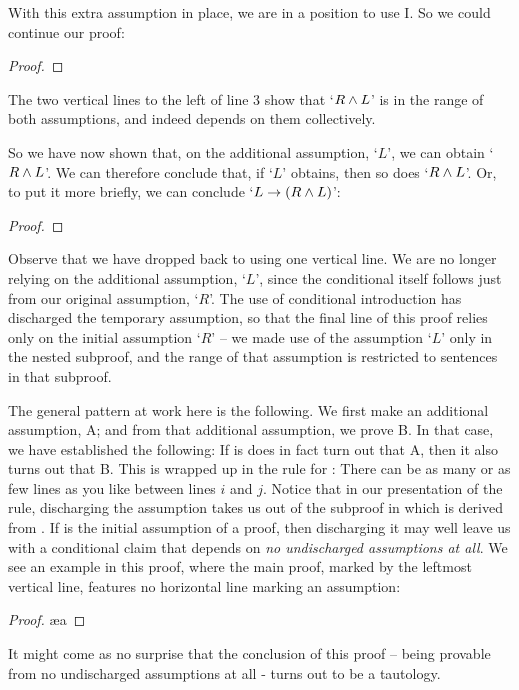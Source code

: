With this extra assumption in place, we are in a position to use {\eand}I. So we could continue our proof:
	\begin{proof}
		\open
	\end{proof} The two vertical lines to the left of line 3 show that `$R\wedge L$' is in the range of both assumptions, and indeed depends on them collectively.

So we have now shown that, on the additional assumption, `$L$', we can obtain `$R \wedge L$'. We can therefore conclude that, if `$L$' obtains, then so does `$R \wedge L$'. Or, to put it more briefly, we can conclude `$L \rightarrow (R \wedge L)$':
	\begin{proof}
		\open
			\close
	\end{proof}
Observe that we have dropped back to using one vertical line.  We are no longer relying on the additional assumption, `$L$', since the conditional itself follows just from our original assumption, `$R$'. The use of conditional introduction has discharged the temporary assumption, so that the final line of this proof relies only on the initial assumption `$R$' – we made use of the assumption `$L$' only in the nested subproof, and the range of that assumption is restricted to sentences in that subproof. 

The general pattern at work here is the following. We first make an additional assumption, A; and from that additional assumption, we prove B. In that case, we have established the following: If is does in fact turn out that A, then it also turns out that B. This is wrapped up in the rule for :
There can be as many or as few lines as you like between lines $i$ and $j$. Notice that in our presentation of the rule, discharging the assumption  takes us out of the subproof in which  is derived from . If  is the initial assumption of a proof, then discharging it may well leave us with a conditional claim that depends on \emph{no undischarged assumptions at all}. We see an example in this proof, where the main proof, marked by the leftmost vertical line, features no horizontal line marking an assumption:
\begin{proof}
	\open {}
	\ae{a}
	\close
\end{proof} It might come as no surprise that the conclusion of this proof – being provable from no undischarged assumptions at all - turns out to be a tautology. 


